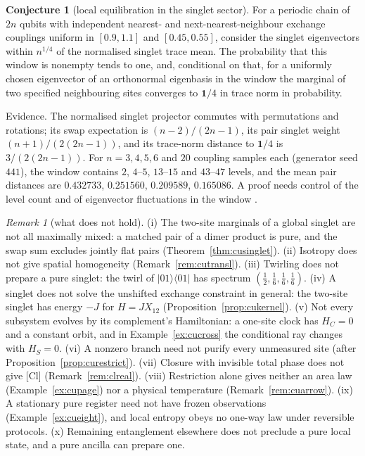 \documentclass[aps,pra,onecolumn,superscriptaddress,nofootinbib,10pt]{revtex4-2}
\theoremstyle{definition}
\newtheorem{conjecture}[theorem]{Conjecture}
\theoremstyle{remark}
\newtheorem{remark}[theorem]{Remark}
\begin{document}
\begin{conjecture}[local equilibration in the singlet sector]\label{conj:cueth}
For a periodic chain of $2n$ qubits with independent nearest- and next-nearest-neighbour exchange couplings
uniform in $[0.9,1.1]$ and $[0.45,0.55]$, consider the singlet eigenvectors within $n^{1/4}$ of the normalised singlet
trace mean.  The probability that this window is nonempty tends to one, and, conditional on that, for a
uniformly chosen eigenvector of an orthonormal eigenbasis in the window the marginal of two specified
neighbouring sites converges to $\mathbf1/4$ in trace norm in probability.
\end{conjecture}
\noindent Evidence.  The normalised singlet projector commutes with permutations and rotations; its swap
expectation is $(n-2)/(2n-1)$, its pair singlet weight $(n+1)/(2(2n-1))$, and its trace-norm distance to $\mathbf1/4$ is
$3/(2(2n-1))$.  For $n=3,4,5,6$ and $20$ coupling samples each (generator seed $441$), the window contains $2$, $4$--$5$,
$13$--$15$ and $43$--$47$ levels, and the mean pair distances are $0.432733$, $0.251560$, $0.209589$, $0.165086$.  A proof
needs control of the level count and of eigenvector fluctuations in the window \cite{n1-eth}.

\begin{remark}[what does not hold]\label{rem:cunogo}
(i) The two-site marginals of a global singlet are not all maximally mixed: a matched pair of a
dimer product is pure, and the swap sum excludes jointly flat pairs (Theorem~\ref{thm:cusinglet}).  (ii) Isotropy does
not give spatial homogeneity (Remark~\ref{rem:cutransl}).  (iii) Twirling does not prepare a pure singlet: the
twirl of $\lvert01\rangle\langle01\rvert$ has spectrum $(\tfrac12,\tfrac16,\tfrac16,\tfrac16)$.  (iv) A singlet does not solve the unshifted exchange
constraint in general: the two-site singlet has energy $-J$ for $H=JX_{12}$ (Proposition~\ref{prop:cukernel}).  (v) Not every
subsystem evolves by its complement's Hamiltonian: a one-site clock has $H_C=0$ and a constant orbit, and
in Example~\ref{ex:cucross} the conditional ray changes with $H_S=0$.  (vi) A nonzero branch need not purify every
unmeasured site (after Proposition~\ref{prop:curestrict}).  (vii) Closure with invisible total phase does not give [Cl]
(Remark~\ref{rem:clreal}).  (viii) Restriction alone gives neither an area law (Example~\ref{ex:cupage}) nor a physical
temperature (Remark~\ref{rem:cuarrow}).  (ix) A stationary pure register need not have frozen observations
(Example~\ref{ex:cueight}), and local entropy obeys no one-way law under reversible protocols.  (x) Remaining
entanglement elsewhere does not preclude a pure local state, and a pure ancilla can prepare one.
\end{remark}
\end{document}
